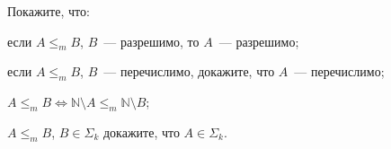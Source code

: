Покажите, что:
\begin{enumcyr}
    \item если $A {\le}_{m} B$, $B$~--- разрешимо, то $A$~--- разрешимо;
    \item если $A {\le}_{m} B$, $B$~--- перечислимо, докажите, что $A$~--- перечислимо;
    \item $A {\le}_{m} B \Leftrightarrow \mathbb{N} \setminus A \le_m \mathbb{N} \setminus B$;
    \item $A {\le}_{m} B$, $B \in \Sigma_k$ докажите, что $A \in \Sigma_k$.
\end{enumcyr}
